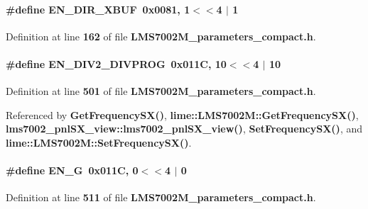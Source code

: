 \paragraph[{E\+N\+\_\+\+D\+I\+R\+\_\+\+X\+B\+UF}]{\setlength{\rightskip}{0pt plus 5cm}\#define E\+N\+\_\+\+D\+I\+R\+\_\+\+X\+B\+UF~0x0081, 1$<$$<$4 $\vert$  1}\label{LMS7002M__parameters__compact_8h_a9370d296fc65c80cb4fcabb7e1692747}


Definition at line {\bf 162} of file {\bf L\+M\+S7002\+M\+\_\+parameters\+\_\+compact.\+h}.

\paragraph[{E\+N\+\_\+\+D\+I\+V2\+\_\+\+D\+I\+V\+P\+R\+OG}]{\setlength{\rightskip}{0pt plus 5cm}\#define E\+N\+\_\+\+D\+I\+V2\+\_\+\+D\+I\+V\+P\+R\+OG~0x011\+C, 10$<$$<$4 $\vert$  10}\label{LMS7002M__parameters__compact_8h_a90966c42ffa9bec6642272b687af238e}


Definition at line {\bf 501} of file {\bf L\+M\+S7002\+M\+\_\+parameters\+\_\+compact.\+h}.



Referenced by {\bf Get\+Frequency\+S\+X()}, {\bf lime\+::\+L\+M\+S7002\+M\+::\+Get\+Frequency\+S\+X()}, {\bf lms7002\+\_\+pnl\+S\+X\+\_\+view\+::lms7002\+\_\+pnl\+S\+X\+\_\+view()}, {\bf Set\+Frequency\+S\+X()}, and {\bf lime\+::\+L\+M\+S7002\+M\+::\+Set\+Frequency\+S\+X()}.

\paragraph[{E\+N\+\_\+G}]{\setlength{\rightskip}{0pt plus 5cm}\#define E\+N\+\_\+G~0x011\+C, 0$<$$<$4 $\vert$  0}\label{LMS7002M__parameters__compact_8h_a7b16c72e8c9eb65c3f4f0e25c8a1cca4}


Definition at line {\bf 511} of file {\bf L\+M\+S7002\+M\+\_\+parameters\+\_\+compact.\+h}.



